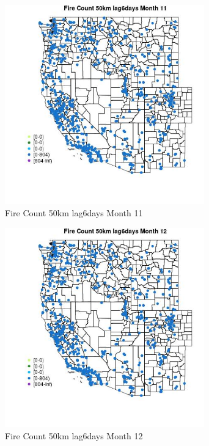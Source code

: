 \begin{figure} 
\centering  
\includegraphics[width=0.77\textwidth]{Code_Outputs/Report_ML_input_PM25_Step4_part_f_de_duplicated_aveswNAs_MapObsMo11Fire_Count_50km_lag6days.jpg} 
\caption{\label{fig:Report_ML_input_PM25_Step4_part_f_de_duplicated_aveswNAsMapObsMo11Fire_Count_50km_lag6days}Fire Count 50km lag6days Month 11} 
\end{figure} 
 

\begin{figure} 
\centering  
\includegraphics[width=0.77\textwidth]{Code_Outputs/Report_ML_input_PM25_Step4_part_f_de_duplicated_aveswNAs_MapObsMo12Fire_Count_50km_lag6days.jpg} 
\caption{\label{fig:Report_ML_input_PM25_Step4_part_f_de_duplicated_aveswNAsMapObsMo12Fire_Count_50km_lag6days}Fire Count 50km lag6days Month 12} 
\end{figure} 
 


